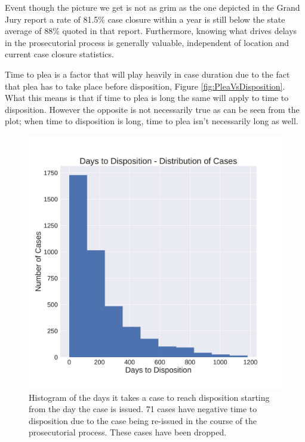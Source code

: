 \documentclass{AISB2008}
\begin{document}
Event though the picture we get is not as grim as the one depicted in the Grand Jury report a rate of 81.5\% case closure within a year is still below the state average of 88\% quoted in that report. Furthermore, knowing what drives delays in the prosecutorial process is generally valuable, independent of location and current case closure statistics. 

Time to plea is a factor that will play heavily in case duration due to the fact that plea has to take place before disposition, Figure \ref{fig:PleaVsDisposition}. What this means is that if time to plea is long the same will apply to time to disposition. However the opposite is not necessarily true as can be seen from the plot; when time to disposition is long, time to plea isn't necessarily long as well.



\begin{figure}[h!]
\begin{center}
\includegraphics[width=0.70\columnwidth]{figures/time_to_dispo_histo/time_to_dispo_histo.png}
\caption{Histogram of the days it takes a case to reach disposition starting from the day the case is issued. 71 cases have negative time to disposition due to the case being re-issued in the course of the prosecutorial process. These cases have been dropped.
\label{fig:daysToDispo}%
}
\end{center}
\end{figure}
\end{document}

